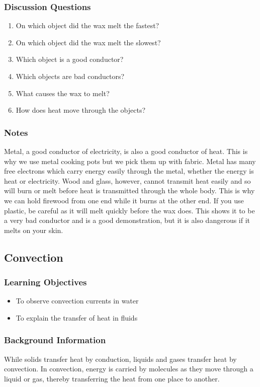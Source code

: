 \subsubsection*{Discussion Questions}
\begin{enumerate}
\item{On which object did the wax melt the fastest?}
\item{On which object did the wax melt the slowest?}
\item{Which object is a good conductor?}
\item{Which objects are bad conductors?}
\item{What causes the wax to melt?}
\item{How does heat move through the objects?}
\end{enumerate}

\subsubsection*{Notes}
Metal, a good conductor of electricity, is also a good conductor of heat. This is why we use metal cooking pots but we pick them up with fabric. Metal has many free electrons which carry energy easily through the metal, whether the energy is heat or electricity. Wood and glass, however, cannot transmit heat easily and so will burn or melt before heat is transmitted through the whole body. This is why we can hold firewood from one end while it burns at the other end.  
If you use plastic, be careful as it will melt quickly before the wax does. This shows it to be a very bad conductor and is a good demonstration, but it is also dangerous if it melts on your skin.  

\subsection{Convection}

\subsubsection*{Learning Objectives}
\begin{itemize}
\item{To observe convection currents in water}
\item{To explain the transfer of heat in fluids}
\end{itemize}

\subsubsection*{Background Information}
While solids transfer heat by conduction, liquids and gases transfer heat by convection.  In convection, energy is carried by molecules as they move through a liquid or gas, thereby transferring the heat from one place to another.

